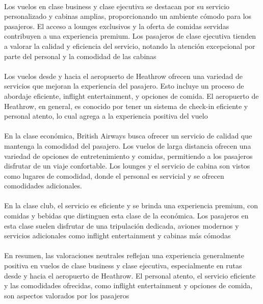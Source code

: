 \documentclass{report}
\begin{document}
{{                    \paragraph*{}{
                        Los vuelos en clase business y clase ejecutiva se destacan por su servicio personalizado y cabinas amplias, proporcionando un ambiente cómodo para los pasajeros. El acceso a lounges exclusivos y la oferta de comidas servidas contribuyen a una experiencia premium. Los pasajeros de clase ejecutiva tienden a valorar la calidad y eficiencia del servicio, notando la atención excepcional por parte del personal y la comodidad de las cabinas
                    }
                    \paragraph*{}{
                        Los vuelos desde y hacia el aeropuerto de Heathrow ofrecen una variedad de servicios que mejoran la experiencia del pasajero. Esto incluye un proceso de abordaje eficiente, inflight entertainment, y opciones de comida. El aeropuerto de Heathrow, en general, es conocido por tener un sistema de check-in eficiente y personal atento, lo cual agrega a la experiencia positiva del vuelo
                    }
                    \paragraph*{}{
                        En la clase económica, British Airways busca ofrecer un servicio de calidad que mantenga la comodidad del pasajero. Los vuelos de larga distancia ofrecen una variedad de opciones de entretenimiento y comidas, permitiendo a los pasajeros disfrutar de un viaje confortable. Los lounges y el servicio de cabina son vistos como lugares de comodidad, donde el personal es servicial y se ofrecen comodidades adicionales.
                    }
                    \paragraph*{}{
                        En la clase club, el servicio es eficiente y se brinda una experiencia premium, con comidas y bebidas que distinguen esta clase de la económica. Los pasajeros en esta clase suelen disfrutar de una tripulación dedicada, aviones modernos y servicios adicionales como inflight entertainment y cabinas más cómodas
                    }
                    \paragraph*{}{
                        En resumen, las valoraciones neutrales reflejan una experiencia generalmente positiva en vuelos de clase business y clase ejecutiva, especialmente en rutas desde y hacia el aeropuerto de Heathrow. El personal atento, el servicio eficiente y las comodidades ofrecidas, como inflight entertainment y opciones de comida, son aspectos valorados por los pasajeros
                    }
}}
\end{document}
